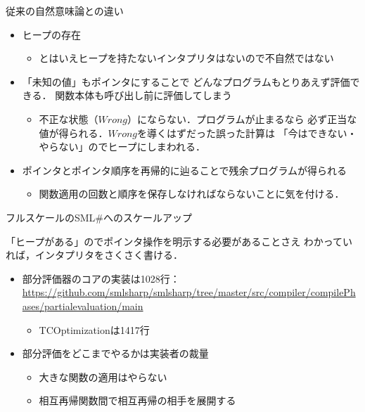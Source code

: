 \documentclass[aspectratio=169,t,dvipdfmx,12pt]{beamer}
\newcommand\smlsharp{SML\#}
\begin{document}
\begin{frame}{従来の自然意味論との違い}

\begin{itemize}
\item ヒープの存在
\begin{itemize}
\item とはいえヒープを持たないインタプリタはないので不自然ではない
\end{itemize}
\bigskip
\item 「未知の値」もポインタにすることで
どんなプログラムもとりあえず評価できる．
関数本体も呼び出し前に評価してしまう
\begin{itemize}
\item 不正な状態（$\mathit{Wrong}$）にならない．プログラムが止まるなら
必ず正当な値が得られる．$\mathit{Wrong}$を導くはずだった誤った計算は
「今はできない・やらない」のでヒープにしまわれる．
\end{itemize}
\bigskip
\item ポインタとポインタ順序を再帰的に辿ることで残余プログラムが得られる
\begin{itemize}
\item 関数適用の回数と順序を保存しなければならないことに気を付ける．
\end{itemize}
\end{itemize}

\end{frame}

\begin{frame}{フルスケールの\smlsharp{}へのスケールアップ}

「ヒープがある」のでポインタ操作を明示する必要があることさえ
わかっていれば，インタプリタをさくさく書ける．
\bigskip
\begin{itemize}
\item 部分評価器のコアの実装は1028行：\url{https://github.com/smlsharp/smlsharp/tree/master/src/compiler/compilePhases/partialevaluation/main}
\begin{itemize}
\item TCOptimizationは1417行
\end{itemize}
\bigskip
\item 部分評価をどこまでやるかは実装者の裁量
\begin{itemize}
\item 大きな関数の適用はやらない
\item 相互再帰関数間で相互再帰の相手を展開する
\end{itemize}
\end{itemize}

\end{frame}
\end{document}
